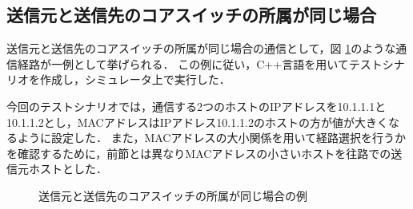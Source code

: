 \subsection{送信元と送信先のコアスイッチの所属が同じ場合}

送信元と送信先のコアスイッチの所属が同じ場合の通信として，図 \ref{fig:4-4}のような通信経路が一例として挙げられる．
この例に従い，C++言語を用いてテストシナリオを作成し，シミュレータ上で実行した．

今回のテストシナリオでは，通信する2つのホストのIPアドレスを10.1.1.1と10.1.1.2とし，MACアドレスはIPアドレス10.1.1.2のホストの方が値が大きくなるように設定した．
また，MACアドレスの大小関係を用いて経路選択を行うかを確認するために，前節とは異なりMACアドレスの小さいホストを往路での送信元ホストとした．

\begin{figure}[tb]
	\begin{center}
		\caption{送信元と送信先のコアスイッチの所属が同じ場合の例}
		\label{fig:4-4}
	\end{center}
\end{figure}

